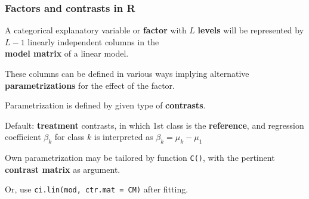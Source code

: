 \documentclass[12pt,dvipsnames,t,handout%
,aspectratio=169%
]{beamer}
\begin{document}
\begin{frame}
\frametitle{Factors and contrasts in R}

\bi
\item
A categorical explanatory variable or {\bf factor}  
with $L$ {\bf levels} will be represented by $L-1$ linearly independent
columns in the \\ {\bf model matrix} of a linear model. 
\medskip
\item
These columns can be defined in various ways implying
alternative {\bf parametrizations} for the effect of the factor.
\medskip
\item 
Parametrization is defined by given type of {\bf contrasts}. 
\medskip
\item 
Default: {\bf treatment} contrasts, in which 1st class is the {\bf reference}, 
and regression coefficient $\beta_k$ for class $k$ is interpreted as $\beta_k = \mu_k - \mu_1$
\medskip
\item
Own parametrization may be tailored by
function {\tt C()}, with the pertinent 
{\bf contrast matrix} as argument.  
\medskip
\item
Or, use {\tt ci.lin(mod, ctr.mat = CM)} after fitting.
\ei
\end{frame}
\end{document}
